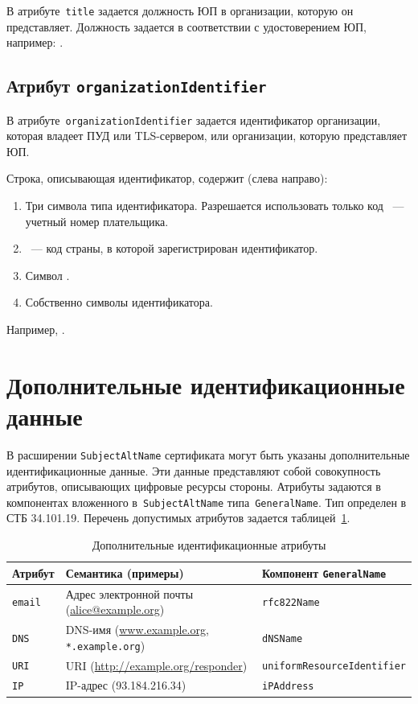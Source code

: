 В атрибуте~\texttt{title} задается должность ЮП в организации, которую он 
представляет. 
%
Должность задается в соответствии с удостоверением ЮП, например:
.

\subsection{Атрибут \texttt{organizationIdentifier}}\label{ENTITIES.Id.ORGID}

В атрибуте~\texttt{organizationIdentifier} задается идентификатор организации,
которая владеет ПУД или TLS-сервером, или организации, которую 
представляет ЮП.

Строка, описывающая идентификатор, содержит (слева направо):
\begin{enumerate}
\item
Три символа типа идентификатора.
Разрешается использовать только код 
~--- учетный номер плательщика.

\item
{}~--- код страны, в которой зарегистрирован идентификатор.

\item
Символ \str{-}.
\item
Собственно символы идентификатора.
\end{enumerate}

Например, .

\section{Дополнительные идентификационные данные}\label{ENTITIES.SAN}

В расширении \texttt{SubjectAltName} сертификата могут быть указаны 
дополнительные идентификационные данные. Эти данные представляют собой 
совокупность атрибутов, описывающих цифровые ресурсы стороны. 
%
Атрибуты задаются в компонентах вложенного в~\texttt{SubjectAltName} 
типа~\texttt{GeneralName}. Тип определен в СТБ 34.101.19.
%
Перечень допустимых атрибутов задается таблицей~\ref{Table.ENTITIES.AttrsEx}. 

\begin{table}[H]
\caption{Дополнительные идентификационные атрибуты}
\label{Table.ENTITIES.AttrsEx}
{
\begin{tabular}{|l|p{9.0cm}|l|}
\hline
Атрибут & Семантика (примеры) & Компонент \texttt{GeneralName}\\
\hline
\hline
\texttt{email} & 
Адрес электронной почты (\url{alice@example.org}) & 
\verb|rfc822Name|\\
%
\texttt{DNS} & 
DNS-имя (\url{www.example.org}, \texttt{*.example.org}) &
\verb|dNSName|\\
%
\texttt{URI} & 
URI (\url{http://example.org/responder}) &
\verb|uniformResourceIdentifier|\\
%
\texttt{IP} & 
IP-адрес (93.184.216.34) &
\verb|iPAddress|\\
\hline
\end{tabular}
}
\end{table}

